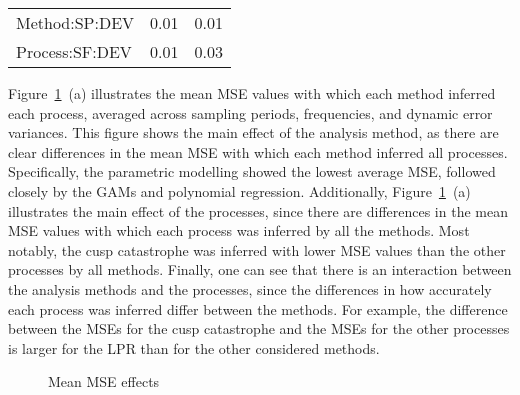 \documentclass[man, floatsintext]{apa7}
\begin{document}
\begin{table}[tbp]
\begin{center}
\begin{threeparttable}
\begin{tabular}{lll}
        Method:SP:DEV      & 0.01                                     & 0.01 \\
        Process:SF:DEV     & 0.01                                     & 0.03 \\
        \bottomrule
      \end{tabular}
    \end{threeparttable}
  \end{center}

\end{table}

Figure~\ref{fig:mean_results_mse}~(a) illustrates the mean MSE values with
which each method inferred each process, averaged across sampling periods,
frequencies, and dynamic error variances. This figure shows the main effect of
the analysis method, as there are clear differences in the mean MSE with which
each method inferred all processes. Specifically, the parametric modelling
showed the lowest average MSE, followed closely by the GAMs and polynomial
regression. Additionally, Figure~\ref{fig:mean_results_mse}~(a) illustrates the
main effect of the processes, since there are differences in the mean MSE
values with which each process was inferred by all the methods. Most notably,
the cusp catastrophe was inferred with lower MSE values than the other
processes by all methods. Finally, one can see that there is an interaction
between the analysis methods and the processes, since the differences in how
accurately each process was inferred differ between the methods. For example,
the difference between the MSEs for the cusp catastrophe and the MSEs for the
other processes is larger for the LPR than for the other considered methods.

\begin{figure}[!t]
  \caption{Mean MSE effects}
  \label{fig:mean_results_mse}
\end{figure}
\end{document}

